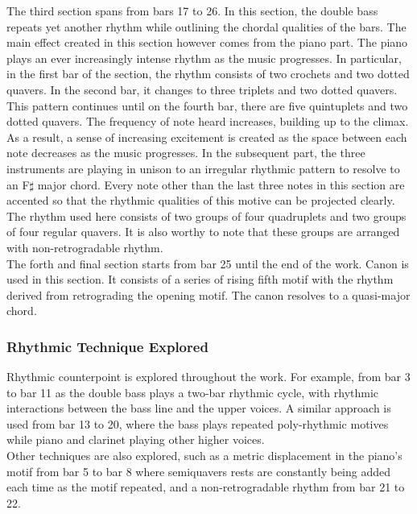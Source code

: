 \documentclass{article}
\begin{document}
The third section spans from bars 17 to 26. In this section, the double bass
repeats yet another rhythm while outlining the chordal qualities of the bars.
The main effect created in this section however comes from the piano part. The
piano plays an ever increasingly intense rhythm as the music progresses. In
particular, in the first bar of the section, the rhythm consists of two
crochets and two dotted quavers. In the second bar, it changes to three
triplets and two dotted quavers. This pattern continues until on the fourth
bar, there are five quintuplets and two dotted quavers. The frequency of note
heard increases, building up to the climax. As a result, a sense of increasing
excitement is created as the space between each note decreases as the music
progresses. In the subsequent part, the three instruments are playing in unison
to an irregular rhythmic pattern to resolve to an F\(\sharp\) major chord.
Every note other than the last three notes in this section are accented so that
the rhythmic qualities of this motive can be projected clearly. The rhythm used
here consists of two groups of four quadruplets and two groups of four regular
quavers. It is also worthy to note that these groups are arranged with
non-retrogradable rhythm.\\

The forth and final section starts from bar 25 until the end of the work.
Canon is used in this section. It consists of a series of rising fifth motif
with the rhythm derived from retrograding the opening motif. The canon resolves
to a quasi-major chord.\\

\subsubsection{Rhythmic Technique Explored} Rhythmic counterpoint is explored
throughout the work. For example, from bar 3 to bar 11 as the double bass plays
a two-bar rhythmic cycle, with rhythmic interactions between the bass
line and the upper voices. A similar approach is used from bar 13 to 20, where
the bass plays repeated poly-rhythmic motives while piano and clarinet playing
other higher voices.\\

Other techniques are also explored, such as a metric displacement in the
piano's motif from bar 5 to bar 8 where semiquavers rests are constantly being
added each time as the motif repeated, and a non-retrogradable rhythm from bar
21 to 22.\\
\end{document}
